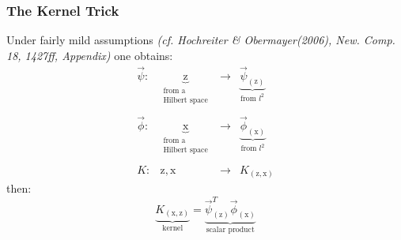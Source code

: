 
\subsubsection{The Kernel Trick}
Under fairly mild assumptions {\it (cf. Hochreiter \& Obermayer(2006), New. Comp. 18, 1427ff, Appendix)} one obtains:
\begin{equation}
	\begin{array}{llll}
	\vec{\psi}: & \underbrace{\mathrm{z}}_{\substack{\text{from a} \\ \text{Hilbert space}}} 
		& \rightarrow & \underbrace{\vec{\psi}_{(\mathrm{z})}}_{ \text{from } l^2} \\\\
	\vec{\phi}: & \underbrace{\mathrm{x}}_{\substack{\text{from a} \\ \text{Hilbert space}}} 
		& \rightarrow & \underbrace{\vec{\phi}_{(\mathrm{x})}}_{ \text{from } l^2} \\\\
	K: & \mathrm{z}, \mathrm{x} & \rightarrow & K_{(\mathrm{z},
							\mathrm{x})}
	\end{array}
\end{equation}
then:
\begin{equation}
	\underbrace{ K_{(\mathrm{x}, \mathrm{z})} }_{\text{kernel}}
	= \underbrace{ \vec{\psi}_{(\mathrm{z})}^T \vec{\phi}_{(\mathrm{x})} }_{
		\text{scalar product}}
\end{equation}


